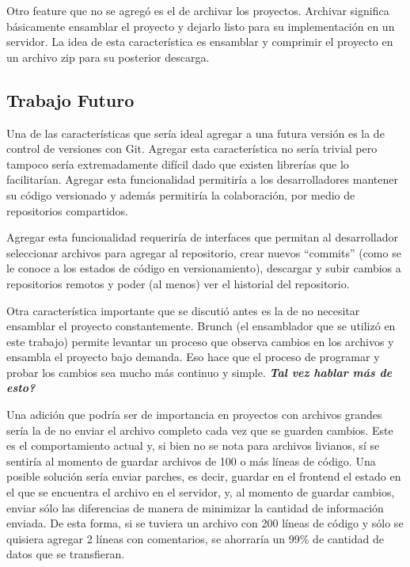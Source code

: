 \documentclass[12pt,titlepage,]{article}
\begin{document}
Otro feature que no se agregó es el de archivar los proyectos. Archivar
significa básicamente ensamblar el proyecto y dejarlo listo para su
implementación en un servidor. La idea de esta característica es
ensamblar y comprimir el proyecto en un archivo zip para su posterior
descarga.

\subsection{Trabajo Futuro}

\label{section:future-work}

Una de las características que sería ideal agregar a una futura versión
es la de control de versiones con Git. Agregar esta característica no
sería trivial pero tampoco sería extremadamente difícil dado que existen
librerías que lo facilitarían. Agregar esta funcionalidad permitiría a
los desarrolladores mantener su código versionado y además permitiría la
colaboración, por medio de repositorios compartidos.

Agregar esta funcionalidad requeriría de interfaces que permitan al
desarrollador seleccionar archivos para agregar al repositorio, crear
nuevos ``commits'' (como se le conoce a los estados de código en
versionamiento), descargar y subir cambios a repositorios remotos y
poder (al menos) ver el historial del repositorio.

Otra característica importante que se discutió antes es la de no
necesitar ensamblar el proyecto constantemente. Brunch (el ensamblador
que se utilizó en este trabajo) permite levantar un proceso que observa
cambios en los archivos y ensambla el proyecto bajo demanda. Eso hace
que el proceso de programar y probar los cambios sea mucho más continuo
y simple. \textbf{\emph{Tal vez hablar más de esto?}}

Una adición que podría ser de importancia en proyectos con archivos
grandes sería la de no enviar el archivo completo cada vez que se
guarden cambios. Este es el comportamiento actual y, si bien no se nota
para archivos livianos, sí se sentiría al momento de guardar archivos de
100 o más líneas de código. Una posible solución sería enviar parches,
es decir, guardar en el frontend el estado en el que se encuentra el
archivo en el servidor, y, al momento de guardar cambios, enviar sólo
las diferencias de manera de minimizar la cantidad de información
enviada. De esta forma, si se tuviera un archivo con 200 líneas de
código y sólo se quisiera agregar 2 líneas con comentarios, se ahorraría
un 99\% de cantidad de datos que se transfieran.
\end{document}
